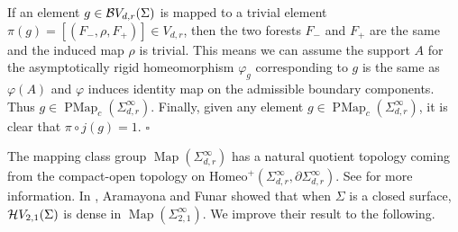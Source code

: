 \documentclass[11pt, a4paper]{amsart}
\theoremstyle{definition}
\def\qed{\hfill$\square$\smallskip}
\DeclareMathOperator{\Map}{Map}
\DeclareMathOperator{\PMap}{PMap}
\begin{document}
If an element $g\in {\mathcal {B}} V_{d,r}(\Sigma) $ is mapped to a trivial element $\pi(g) = [(F_-,\rho,F_+)] \in V_{d,r}$, then the two forests $F_-$ and $F_+$ are the same and the induced map $\rho$ is trivial. This means we can assume the support $A$ for the asymptotically rigid homeomorphism $\varphi_g$ corresponding to $g$ is the same as $\varphi(A)$ and $\varphi$ induces identity map on the admissible boundary components.  Thus $g \in \PMap_c(\Sigma_{d,r}^\infty)$. Finally, given any element $g\in \PMap_c(\Sigma_{d,r}^\infty)$, it is clear that $\pi \circ j(g) = 1$.
\qed
 
The mapping class group $\Map(\Sigma_{d,r}^\infty)$ has a natural 
quotient topology coming from the compact-open topology on $\text{Homeo}^+(\Sigma_{d,r}^\infty, \partial \Sigma_{d,r}^\infty)$. See \cite[Section 2.3, 4.1]{AV20} for more information. In \cite[Theorem 1.3]{AF17}, Aramayona and Funar showed that when $\Sigma$ is a closed surface, ${\mathcal {H}} V_{2,1}(\Sigma)$ is dense in $\Map(\Sigma_{2,1}^\infty)$. We improve their result to the following.
\end{document}
